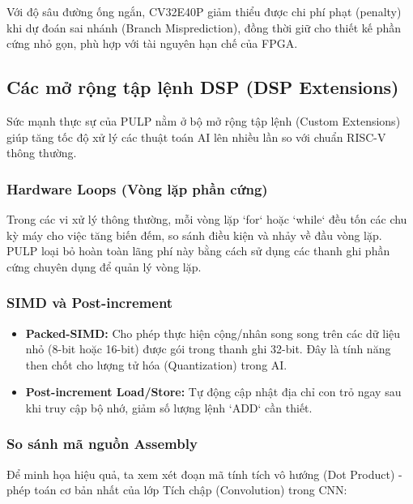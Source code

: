 Với độ sâu đường ống ngắn, CV32E40P giảm thiểu được chi phí phạt (penalty) khi dự đoán sai nhánh (Branch Misprediction), đồng thời giữ cho thiết kế phần cứng nhỏ gọn, phù hợp với tài nguyên hạn chế của FPGA.

\subsection{Các mở rộng tập lệnh DSP (DSP Extensions)}
Sức mạnh thực sự của PULP nằm ở bộ mở rộng tập lệnh (Custom Extensions) giúp tăng tốc độ xử lý các thuật toán AI lên nhiều lần so với chuẩn RISC-V thông thường.

\subsubsection{Hardware Loops (Vòng lặp phần cứng)}
Trong các vi xử lý thông thường, mỗi vòng lặp `for` hoặc `while` đều tốn các chu kỳ máy cho việc tăng biến đếm, so sánh điều kiện và nhảy về đầu vòng lặp. PULP loại bỏ hoàn toàn lãng phí này bằng cách sử dụng các thanh ghi phần cứng chuyên dụng để quản lý vòng lặp.

\subsubsection{SIMD và Post-increment}
\begin{itemize}
    \item \textbf{Packed-SIMD:} Cho phép thực hiện cộng/nhân song song trên các dữ liệu nhỏ (8-bit hoặc 16-bit) được gói trong thanh ghi 32-bit. Đây là tính năng then chốt cho lượng tử hóa (Quantization) trong AI.
    \item \textbf{Post-increment Load/Store:} Tự động cập nhật địa chỉ con trỏ ngay sau khi truy cập bộ nhớ, giảm số lượng lệnh `ADD` cần thiết.
\end{itemize}

\subsubsection{So sánh mã nguồn Assembly}
Để minh họa hiệu quả, ta xem xét đoạn mã tính tích vô hướng (Dot Product) - phép toán cơ bản nhất của lớp Tích chập (Convolution) trong CNN:

